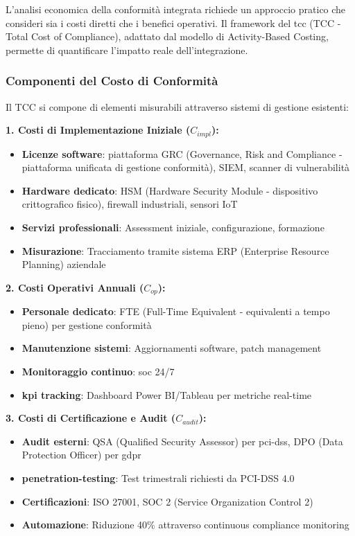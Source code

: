 L'analisi economica della conformità integrata richiede un approccio pratico che consideri sia i costi diretti che i benefici operativi. Il framework del \gls{tcc} (TCC - Total Cost of Compliance), adattato dal modello di Activity-Based Costing\autocite{Kaplan2007}, permette di quantificare l'impatto reale dell'integrazione.

\subsubsection{\texorpdfstring{Componenti del Costo di Conformità}{4.6.1.1 - Componenti del Costo di Conformità}}

Il TCC si compone di elementi misurabili attraverso sistemi di gestione esistenti:

\textbf{1. Costi di Implementazione Iniziale ($C_{impl}$):}
\begin{itemize}
    \item \textbf{Licenze software}: piattaforma GRC (Governance, Risk and Compliance - piattaforma unificata di gestione conformità), SIEM, scanner di vulnerabilità
    \item \textbf{Hardware dedicato}: HSM (Hardware Security Module - dispositivo crittografico fisico), firewall industriali, sensori IoT
    \item \textbf{Servizi professionali}: Assessment iniziale, configurazione, formazione
    \item \textbf{Misurazione}: Tracciamento tramite sistema ERP (Enterprise Resource Planning) aziendale
\end{itemize}

\textbf{2. Costi Operativi Annuali ($C_{op}$):}
\begin{itemize}
    \item \textbf{Personale dedicato}: FTE (Full-Time Equivalent - equivalenti a tempo pieno) per gestione conformità
    \item \textbf{Manutenzione sistemi}: Aggiornamenti software, patch management
    \item \textbf{Monitoraggio continuo}: \gls{soc} 24/7
    \item \textbf{\gls{kpi} tracking}: Dashboard Power BI/Tableau per metriche real-time
\end{itemize}

\textbf{3. Costi di Certificazione e Audit ($C_{audit}$):}
\begin{itemize}
    \item \textbf{Audit esterni}: QSA (Qualified Security Assessor) per \gls{pci-dss}, DPO (Data Protection Officer) per \gls{gdpr}
    \item \textbf{\gls{penetration-testing}}: Test trimestrali richiesti da PCI-DSS 4.0
    \item \textbf{Certificazioni}: ISO 27001, SOC 2 (Service Organization Control 2)
    \item \textbf{Automazione}: Riduzione 40\% attraverso continuous \gls{compliance} monitoring
\end{itemize}

